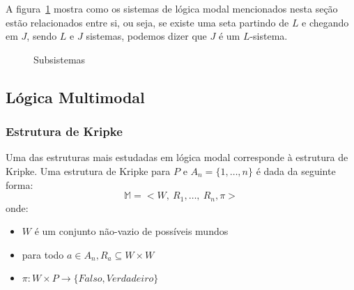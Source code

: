A figura~\ref{fig:subsistemas} mostra como os sistemas de lógica modal
mencionados nesta seção estão
relacionados entre si, ou seja, se existe uma seta partindo de $L$ e chegando em $J$, sendo $L$ e
$J$ sistemas, podemos dizer que $J$ é um $L$-sistema.

\begin{figure}
\label{fig:subsistemas}
\begin{center}
\end{center}
\caption{Subsistemas}
\end{figure}

\subsection{Lógica Multimodal}
\label{sub:lógica_multimodal}


\subsubsection{Estrutura de Kripke}

Uma das estruturas mais estudadas em lógica modal corresponde à estrutura de
Kripke. Uma estrutura de Kripke para $P$ e $A_n = \{1, \ldots, n\}$ é dada da seguinte forma:
\begin{equation}
\mathbb{M} = <W,\ R_1, \ldots,\ R_n, \pi>
\end{equation}
onde:
\begin{itemize}
    \item $W$ é um conjunto não-vazio de possíveis mundos
    \item para todo $a \in A_n, R_a \subseteq W \times W$
    \item $\pi: W \times P \longrightarrow \{Falso, Verdadeiro\}$
\end{itemize}


